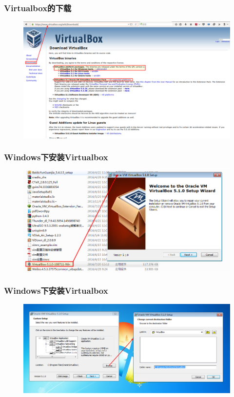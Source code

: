 \frame
{
	\frametitle{\textrm{Virtualbox}的下载}
\begin{figure}[h!]
\centering
\vspace{-5.5pt}
\includegraphics[height=0.57\textwidth]{Figures/Virtualbox-url.png}
\caption{\textrm{\fontsize{6.2pt}{5.2pt}\selectfont{The url page for Virtualbox download.}}}
\label{Virtualbox-url}
\end{figure}
}

\frame
{
	\frametitle{\textrm{Windows}下安装\textrm{Virtualbox}}
\begin{figure}[h!]
\centering
\vspace{-5.5pt}
\includegraphics[height=0.50\textwidth]{Figures/Virtualbox-install-0.png}
\caption{\textrm{\fontsize{6.2pt}{5.2pt}\selectfont{The install step-1 of Virtualbox.}}}
\label{Virtualbox-install-0}
\end{figure}
}

\frame
{
	\frametitle{\textrm{Windows}下安装\textrm{Virtualbox}}
\begin{figure}[h!]
\centering
\vspace{-5.5pt}
\includegraphics[height=0.44\textwidth]{Figures/Virtualbox-install-2.png}
\caption{\textrm{\fontsize{6.2pt}{5.2pt}\selectfont{The install step-2 of Virtualbox.}}}
\label{Virtualbox-install-2}
\end{figure}
}


